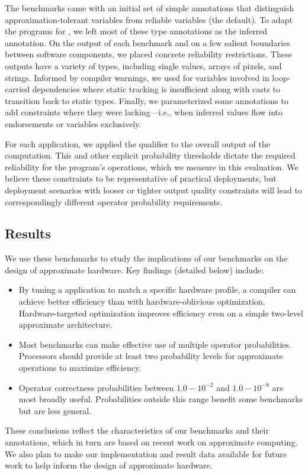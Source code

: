 {The benchmarks came with an initial set of simple annotations that distinguish
approximation-tolerant variables from reliable variables (the default).
To adapt the programs for \lang, we left most of these type annotations as the
inferred  annotation.
On the output of each benchmark and on a few salient boundaries between software components, we placed concrete
 reliability restrictions.
These outputs have a variety of types, including single values, arrays of
pixels, and strings.
Informed by compiler warnings, we used  for variables
involved in loop-carried dependencies where static tracking is insufficient
along with  casts to transition back to static types.
Finally, we parameterized some  annotations to add constraints
where they were lacking---i.e., when inferred values flow into endorsements or
 variables exclusively.

For each application, we applied the  qualifier to the
overall output of the computation.
This and other explicit probability thresholds dictate the required reliability
for the program's operations, which we measure in this evaluation.
We believe these constraints to be representative of practical deployments,
but
deployment scenarios with looser or tighter output quality constraints will
lead to correspondingly different operator probability requirements.

\subsection{Results}

We use these benchmarks to study the implications of our benchmarks on the
design of approximate hardware.
Key findings (detailed below) include:
%
\begin{itemize}
\item By tuning a application to match a specific hardware profile, a compiler
    can achieve better efficiency than with hardware-oblivious optimization.
    Hardware-targeted optimization improves efficiency
    even on a simple two-level approximate architecture.
\item Most benchmarks can make effective use of multiple operator
    probabilities. Processors should provide at least two probability levels
    for approximate operations to maximize efficiency.
\item Operator correctness probabilities between $1.0 - 10^{-2}$ and $1.0 -
    10^{-8}$ are most broadly useful. Probabilities outside this range benefit
    some benchmarks but are less general.
\end{itemize}
%
These conclusions reflect the characteristics of our benchmarks and their
annotations, which in turn are based on recent work on approximate computing.
We also plan to make our implementation and result data available for future work to help
inform
the design of approximate hardware.

}
